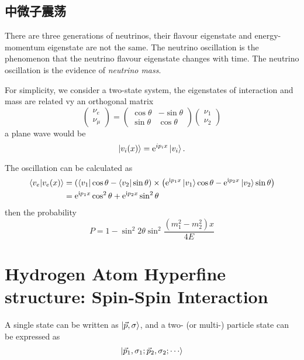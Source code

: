 
\section[Neutrino Oscillation]{中微子震荡}
There are three generations of neutrinos, their flavour eigenstate and energy-momentum eigenstate are not the same. The neutrino oscillation is the phenomenon that the neutrino flavour eigenstate changes with time. The neutrino oscillation is the evidence of \emph{neutrino mass}.

For simplicity, we consider a two-state system, the eigenstates of  interaction and mass are related vy an orthogonal matrix
\begin{equation}
    \begin{pmatrix}
        \nu_e \\ \nu_\mu
    \end{pmatrix}
    =
    \begin{pmatrix}
        \cos\theta & -\sin\theta \\
        \sin\theta & \cos\theta
    \end{pmatrix}
    \begin{pmatrix}
        \nu_1 \\ \nu_2
    \end{pmatrix}
\end{equation}
a plane wave would be 
\begin{equation}
  \ket{v_i(x)} = \mathrm{e}^{i p_i x} \ket{v_i}.
\end{equation}

The oscillation can be calculated as
\begin{align}
  \bra{v_e} \ket{v_e (x)} & = \left( \bra{v_1} \cos \theta - \bra{v_2} \sin \theta \right) \times \left( \mathrm{e}^{\mathrm{i}  p_1 x} \ket{v_1} \cos \theta - \mathrm{e}^{\mathrm{i}  p_2 x} \ket{v_2} \sin \theta \right)
  \\
  & = \mathrm{e}^{\mathrm{i} p_1 x} \cos^{2} \theta + \mathrm{e}^{\mathrm{i} p_2 x} \sin^{2} \theta
\end{align}
then the probability
\begin{equation}
  P = 1 - \sin ^{2} 2\theta \sin ^{2} \frac{\left( m_1^{2} - m_2^{2} \right) x }{4E}
\end{equation}

\chapter[氢原子的超精细结构]{Hydrogen Atom Hyperfine structure: Spin-Spin Interaction}

A single state can be written as $\ket{\vec{p}, \sigma}$, and a two- (or multi-) particle state can be expressed as 
\begin{equation}
  \ket{\vec{p}_1, \sigma_1; \vec{p}_2, \sigma_2; \cdots}
\end{equation}
